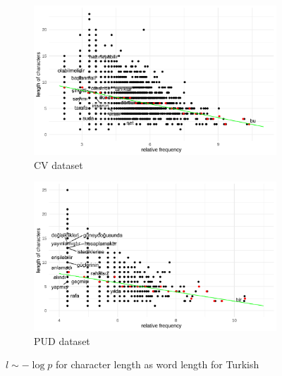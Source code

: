 \begin{figure}[H]
  \centering
  \begin{subfigure}[b]{0.48\textwidth}
    \centering
    \includegraphics[width=\textwidth]{plots/Turkish_logp_cl_CV.pdf}
    \caption{CV dataset}
  \end{subfigure}
  \hfill
  \begin{subfigure}[b]{0.48\textwidth}
    \centering
    \includegraphics[width=\textwidth]{plots/Turkish_logp_cl_PUD.pdf}
    \caption{PUD dataset}
  \end{subfigure}
  \caption{$l \sim -\log p$ for character length as word length for Turkish}
\end{figure}
